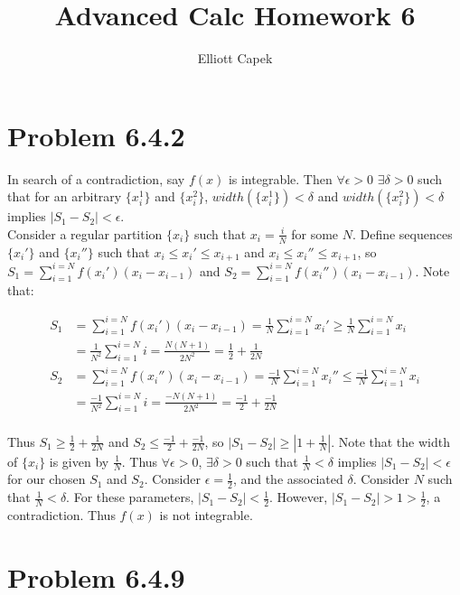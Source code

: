 \documentclass[10pt]{article} %
\title{Advanced Calc Homework 6}
\author{Elliott Capek}
\begin{document}
\maketitle{}

\section{Problem 6.4.2}
In search of a contradiction, say $f(x)$ is integrable. Then $\forall \epsilon > 0$ $\exists \delta>0$ such that for an arbitrary $\{x_i^1\}$ and $\{x_i^2\}$, $width(\{x_i^1\})<\delta$ and $width(\{x_i^2\})<\delta$ implies $|S_1-S_2|<\epsilon$.\\

Consider a regular partition $\{x_i\}$ such that $x_i = \frac{i}{N}$ for some $N$. Define sequences $\{x_i'\}$ and $\{x_i''\}$ such that $x_i \leq x_i' \leq x_{i+1}$ and $x_i \leq x_i'' \leq x_{i+1}$, so $S_1 = \sum_{i=1}^{i=N}f(x_i')\left(x_i-x_{i-1}\right)$ and $S_2 = \sum_{i=1}^{i=N}f(x_i'')\left(x_i-x_{i-1}\right)$. Note that:

\begin{align*}
  S_1 &= \sum_{i=1}^{i=N}f(x_i')(x_i-x_{i-1}) = \frac{1}{N}\sum_{i=1}^{i=N}x_i' \geq \frac{1}{N}\sum_{i=1}^{i=N}x_i\\
  &= \frac{1}{N^2}\sum_{i=1}^{i=N}i = \frac{N(N+1)}{2N^2} = \frac{1}{2} + \frac{1}{2N}\\
  S_2 &= \sum_{i=1}^{i=N}f(x_i'')(x_i-x_{i-1}) = \frac{-1}{N}\sum_{i=1}^{i=N}x_i'' \leq \frac{-1}{N}\sum_{i=1}^{i=N}x_i\\
  &= \frac{-1}{N^2}\sum_{i=1}^{i=N}i = \frac{-N(N+1)}{2N^2} = \frac{-1}{2} + \frac{-1}{2N}\\
\end{align*}

Thus $S_1 \geq \frac{1}{2} + \frac{1}{2N}$ and $S_2 \leq \frac{-1}{2} + \frac{-1}{2N}$, so $|S_1-S_2| \geq |1 + \frac{1}{N}|$. Note that the width of $\{x_i\}$ is given by $\frac{1}{N}$. Thus $\forall \epsilon>0$, $\exists \delta > 0$ such that $\frac{1}{N}<\delta$ implies $|S_1-S_2|<\epsilon$ for our chosen $S_1$ and $S_2$. Consider $\epsilon = \frac{1}{2}$, and the associated $\delta$. Consider $N$ such that $\frac{1}{N}<\delta$. For these parameters, $|S_1 - S_2| < \frac{1}{2}$. However, $|S_1-S_2|>1>\frac{1}{2}$, a contradiction. Thus $f(x)$ is not integrable.\\

\section{Problem 6.4.9}
\end{document}
